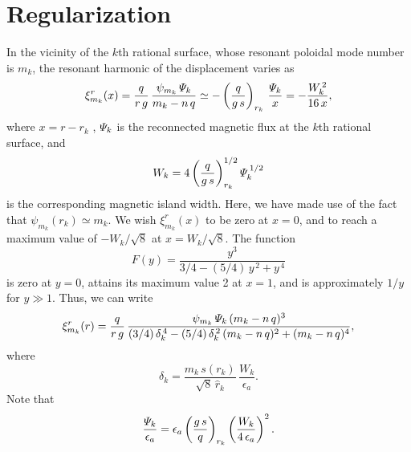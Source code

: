 \documentclass[12pt,prb,aps,notitlepage]{revtex4-1}
\begin{document}
\section{Regularization}
In the vicinity of the $k$th rational surface, whose resonant poloidal mode number is $m_k$,  the resonant harmonic of the displacement varies as
\begin{equation}
\xi^r_{m_k}(x)= \frac{q}{r\,g}\,\frac{\psi_{m_k}\,{\mit\Psi}_k}{m_k-n\,q}\simeq -\left(\frac{q}{g\,s}\right)_{r_k} \,\frac{{\mit\Psi}_k}{x}= -\frac{W_k^{\,2}}{16\,x},
\end{equation}
where $x=r-r_k$ , ${\mit\Psi}_k$ is the reconnected magnetic flux at the $k$th rational surface, and
\begin{equation}
W_k = 4\left(\frac{q}{g\,s}\right)_{r_k}^{1/2}{\mit\Psi}_k^{\,1/2}
\end{equation}
is the corresponding magnetic island width. Here, we have made use of the fact that $\psi_{m_k}(r_k)\simeq m_k$. 
We wish $\xi^r_{m_k}(x)$ to be zero at $x=0$, and to reach a maximum value of $-W_k/\sqrt{8}$ at $x=W_k/\sqrt{8}$. 
The function
\begin{equation}
F(y)= \frac{y^3}{3/4-(5/4)\,y^{\,2}+y^{\,4}}
\end{equation}
is zero at $y=0$, attains its maximum value 2 at $x=1$,  and is approximately $1/y$  for $y\gg 1$. Thus, we can write
\begin{equation}
\xi^r_{m_k}(r) = \frac{q}{r\,g}\,\frac{\psi_{m_k}\,{\mit\Psi}_k\,(m_k-n\,q)^3}{(3/4)\,\delta_k^{\,4} -(5/4)\,\delta_k^{\,2}\,(m_k-n\,q)^2 +(m_k-n\,q)^4},
\end{equation}
where 
\begin{equation}
\delta_k = \frac{m_k\,s(r_k)}{\sqrt{8}\,\hat{r}_k}\,\frac{W_k}{\epsilon_a}.
\end{equation}
Note that
\begin{equation}
\frac{{\mit\Psi}_k}{\epsilon_a}= \epsilon_a \left(\frac{g\,s}{q}\right)_{r_k}\left(\frac{W_k}{4\,\epsilon_a}\right)^2.
\end{equation}
\end{document}
